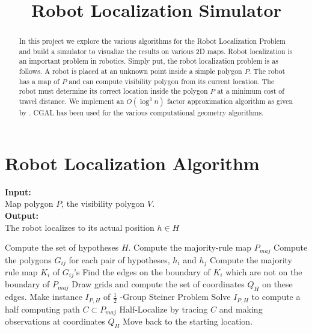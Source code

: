 \documentclass[a4paper,10pt]{article}
\title{Robot Localization Simulator}
\author{}
\begin{document}
\maketitle

\begin{abstract}
In this project we explore the various algorithms for the Robot Localization Problem and build a simulator to visualize the results on
various 2D maps.
Robot localization is an important problem in robotics. Simply put, the robot localization problem is as follows. A robot is 
placed at an unknown point inside a simple polygon $ P $. The robot has a map of 
$ P$ and can compute visibility polygon from its current location. The robot must determine its correct 
location inside the polygon $P $ at a minimum cost of travel distance. We implement an ${O(\log^3 n)} $ factor approximation algorithm 
as given by \cite{key1}. CGAL \cite{key2} has been used for the various computational geometry algorithms.

\end{abstract}

\newpage
\section{Robot Localization Algorithm}

{\bf Input:}\\
Map polygon $P$, the visibility polygon $V$.
\\
{\bf Output:}\\
The robot localizes to its actual position $h \in H$
\\
\begin{algorithmic}[1]
  \STATE Compute the set of hypotheses $H$.
  \STATE Compute the majority-rule map $P_{maj}$
  \STATE Compute the polygons $G_{ij}$ for each pair of hypotheses, $h_{i}$ and $h_{j}$
  \STATE Compute the majority rule map $K_{i}$ of $G_{ij}$'s
  \STATE Find the edges on the boundary of $K_{i}$ which are not on the boundary of $P_{maj}$
  \STATE Draw grids and compute the set of coordinates $Q_{H}$ on these edges.
  \STATE Make instance $I_{P,H}$  of $\frac{1}{2}$ -Group Steiner Problem
  \STATE Solve $I_{P,H}$ to compute a half computing path $C \subset P_{maj}$
  \STATE Half-Localize by tracing $C $ and making observations at coordinates $Q_{H}$
  \STATE Move back to the starting location.
 \ENDWHILE
\end{algorithmic}

\newpage
\end{document}

